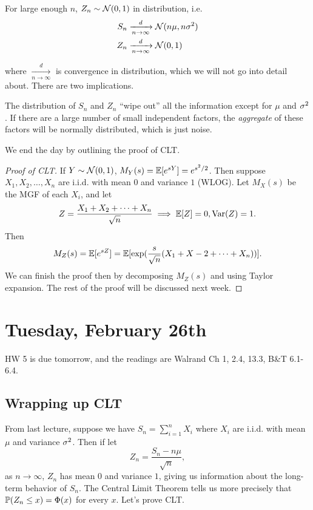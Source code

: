 \documentclass[11 pt]{scrartcl}
\begin{document}
For large enough $n$, $Z_n\sim\mathcal{N}(0,1)$ in distribution, i.e. 
\begin{align*}
    S_n &\xrightarrow[n\to\infty]{d} \mathcal{N}(n\mu, n\sigma^2) \\
    Z_n &\xrightarrow[n\to\infty]{d} \mathcal{N}(0, 1) 
\end{align*}

where $\xrightarrow[n\to\infty]{d}$ is convergence in distribution, which we will not go into detail about. There are two implications. 
\begin{enumerate}
    \ii The distribution of $S_n$ and $Z_n$ ``wipe out'' all the information except for $\mu$ and $\sigma^2$. 
    \ii If there are a large number of small independent factors, the \emph{aggregate} of these factors will be normally distributed, which is just noise. 
\end{enumerate}

We end the day by outlining the proof of CLT. 
\begin{proof}[Proof of CLT]
    If $Y\sim \mathcal{N}(0,1)$, $M_Y(s) = \mathbb E[e^{sY}] = e^{s^2/2}$. Then suppose $X_1, X_2, \dots, X_n$ are i.i.d. with mean $0$ and variance $1$ (WLOG). Let $M_X(s)$ be the MGF of each $X_i$, and let 
    \[ Z = \dfrac{X_1 + X_2 + \dots + X_n}{\sqrt{n}} \implies \mathbb E[Z] = 0, \text{Var}(Z) = 1.\] 
    Then 
    \[ M_Z(s) = \mathbb E[e^{sZ}] = \mathbb E[\exp(\frac{s}{\sqrt{n}}(X_1 + X-2 + \dots + X_n))].\] 
    We can finish the proof then by decomposing $M_Z(s)$ and using Taylor expansion. The rest of the proof will be discussed next week. 
\end{proof}

\newpage
\section{Tuesday, February 26th}
HW 5 is due tomorrow, and the readings are Walrand Ch 1, 2.4, 13.3, B\&T 6.1-6.4. 

\subsection{Wrapping up CLT}
From last lecture, suppose we have $S_n = \sum_{i=1}^n X_i$ where $X_i$ are i.i.d. with mean $\mu$ and variance $\sigma^2$. Then if let 
\[ Z_n = \dfrac{S_n - n\mu}{\sqrt{n}},\]
as $n\to\infty$, $Z_n$ has mean $0$ and variance $1$, giving us information about the long-term behavior of $S_n$. The Central Limit Theorem tells us more precisely that $\mathbb P(Z_n\leq x) = \Phi(x)$ for every $x$. Let's prove CLT. 
\end{document}
